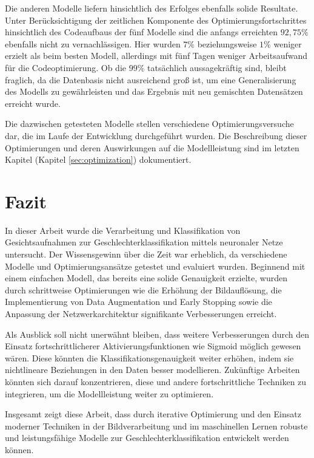 \documentclass[journal,twoside,web]{ieeecolor}
\begin{document}
Die anderen Modelle liefern hinsichtlich des Erfolges ebenfalls solide Resultate. 
Unter Berücksichtigung der zeitlichen Komponente des Optimierungsfortschrittes hinsichtlich des Codeaufbaus der fünf Modelle sind die anfangs erreichten $92,75 \%$ ebenfalls nicht zu vernachlässigen. Hier wurden $7\%$ beziehungsweise $1\%$ weniger erzielt als beim besten Modell, allerdings mit fünf Tagen weniger Arbeitsaufwand für die Codeoptimierung. Ob die $99\%$ tatsächlich aussagekräftig sind, bleibt fraglich, da die Datenbasis nicht ausreichend groß ist, um eine Generalisierung des Modells zu gewährleisten und das Ergebnis mit neu gemischten Datensätzen erreicht wurde.

Die dazwischen getesteten Modelle stellen verschiedene Optimierungsversuche dar, die im Laufe der Entwicklung durchgeführt wurden. Die Beschreibung dieser Optimierungen und deren Auswirkungen auf die Modellleistung sind im letzten Kapitel (Kapitel \ref{sec:optimization}) dokumentiert.

\section{Fazit}
\label{sec:conclusion}
In dieser Arbeit wurde die Verarbeitung und Klassifikation von Gesichtsaufnahmen zur Geschlechterklassifikation mittels neuronaler Netze untersucht. Der Wissensgewinn über die Zeit war erheblich, da verschiedene Modelle und Optimierungsansätze getestet und evaluiert wurden. Beginnend mit einem einfachen Modell, das bereits eine solide Genauigkeit erzielte, wurden durch schrittweise Optimierungen wie die Erhöhung der Bildauflösung, die Implementierung von Data Augmentation und Early Stopping sowie die Anpassung der Netzwerkarchitektur signifikante Verbesserungen erreicht.


Als Ausblick soll nicht unerwähnt bleiben, dass weitere Verbesserungen durch den Einsatz fortschrittlicherer Aktivierungsfunktionen wie Sigmoid möglich gewesen wären. Diese könnten die Klassifikationsgenauigkeit weiter erhöhen, indem sie nichtlineare Beziehungen in den Daten besser modellieren. Zukünftige Arbeiten könnten sich darauf konzentrieren, diese und andere fortschrittliche Techniken zu integrieren, um die Modellleistung weiter zu optimieren.

Insgesamt zeigt diese Arbeit, dass durch iterative Optimierung und den Einsatz moderner Techniken in der Bildverarbeitung und im maschinellen Lernen robuste und leistungsfähige Modelle zur Geschlechterklassifikation entwickelt werden können.
\end{document}
